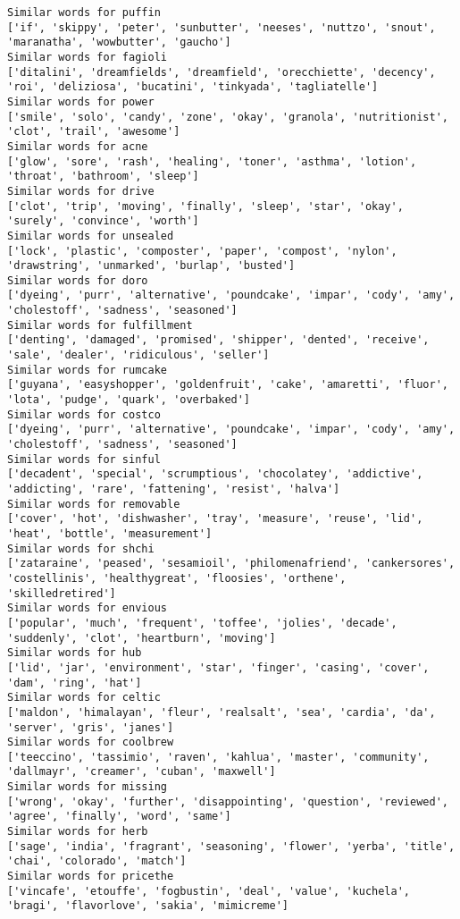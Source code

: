 \documentclass[11pt]{article}
\begin{document}
\begin{Verbatim}[commandchars=\\\{\}]
Similar words for puffin
['if', 'skippy', 'peter', 'sunbutter', 'neeses', 'nuttzo', 'snout', 'maranatha', 'wowbutter', 'gaucho']
Similar words for fagioli
['ditalini', 'dreamfields', 'dreamfield', 'orecchiette', 'decency', 'roi', 'deliziosa', 'bucatini', 'tinkyada', 'tagliatelle']
Similar words for power
['smile', 'solo', 'candy', 'zone', 'okay', 'granola', 'nutritionist', 'clot', 'trail', 'awesome']
Similar words for acne
['glow', 'sore', 'rash', 'healing', 'toner', 'asthma', 'lotion', 'throat', 'bathroom', 'sleep']
Similar words for drive
['clot', 'trip', 'moving', 'finally', 'sleep', 'star', 'okay', 'surely', 'convince', 'worth']
Similar words for unsealed
['lock', 'plastic', 'composter', 'paper', 'compost', 'nylon', 'drawstring', 'unmarked', 'burlap', 'busted']
Similar words for doro
['dyeing', 'purr', 'alternative', 'poundcake', 'impar', 'cody', 'amy', 'cholestoff', 'sadness', 'seasoned']
Similar words for fulfillment
['denting', 'damaged', 'promised', 'shipper', 'dented', 'receive', 'sale', 'dealer', 'ridiculous', 'seller']
Similar words for rumcake
['guyana', 'easyshopper', 'goldenfruit', 'cake', 'amaretti', 'fluor', 'lota', 'pudge', 'quark', 'overbaked']
Similar words for costco
['dyeing', 'purr', 'alternative', 'poundcake', 'impar', 'cody', 'amy', 'cholestoff', 'sadness', 'seasoned']
Similar words for sinful
['decadent', 'special', 'scrumptious', 'chocolatey', 'addictive', 'addicting', 'rare', 'fattening', 'resist', 'halva']
Similar words for removable
['cover', 'hot', 'dishwasher', 'tray', 'measure', 'reuse', 'lid', 'heat', 'bottle', 'measurement']
Similar words for shchi
['zataraine', 'peased', 'sesamioil', 'philomenafriend', 'cankersores', 'costellinis', 'healthygreat', 'floosies', 'orthene', 'skilledretired']
Similar words for envious
['popular', 'much', 'frequent', 'toffee', 'jolies', 'decade', 'suddenly', 'clot', 'heartburn', 'moving']
Similar words for hub
['lid', 'jar', 'environment', 'star', 'finger', 'casing', 'cover', 'dam', 'ring', 'hat']
Similar words for celtic
['maldon', 'himalayan', 'fleur', 'realsalt', 'sea', 'cardia', 'da', 'server', 'gris', 'janes']
Similar words for coolbrew
['teeccino', 'tassimio', 'raven', 'kahlua', 'master', 'community', 'dallmayr', 'creamer', 'cuban', 'maxwell']
Similar words for missing
['wrong', 'okay', 'further', 'disappointing', 'question', 'reviewed', 'agree', 'finally', 'word', 'same']
Similar words for herb
['sage', 'india', 'fragrant', 'seasoning', 'flower', 'yerba', 'title', 'chai', 'colorado', 'match']
Similar words for pricethe
['vincafe', 'etouffe', 'fogbustin', 'deal', 'value', 'kuchela', 'bragi', 'flavorlove', 'sakia', 'mimicreme']

\end{Verbatim}
\end{document}
